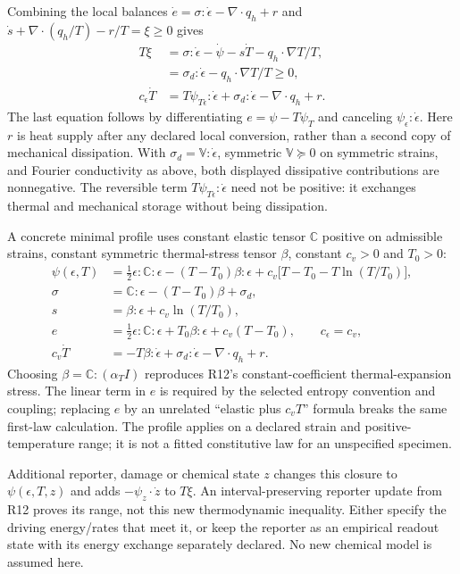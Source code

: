 Combining the local balances
$\dot e=\sigma:\dot\epsilon-\nabla\!\cdot q_h+r$ and
$\dot s+\nabla\!\cdot(q_h/T)-r/T=\xi\ge0$ gives
\begin{align}
 T\xi&=\sigma:\dot\epsilon-\dot\psi-s\dot T
                       -q_h\!\cdot\nabla T/T,\\
 &=\sigma_d:\dot\epsilon-q_h\!\cdot\nabla T/T\ge0,\\
 c_\epsilon\dot T&=T\psi_{T\epsilon}:\dot\epsilon
          +\sigma_d:\dot\epsilon-\nabla\!\cdot q_h+r.
 \label{eq:r13-reciprocal-heat}
\end{align}
The last equation follows by differentiating
$e=\psi-T\psi_T$ and canceling $\psi_\epsilon:\dot\epsilon$.
Here $r$ is heat supply after any declared local conversion, rather than a
second copy of mechanical dissipation. With
$\sigma_d=\mathbb V:\dot\epsilon$, symmetric $\mathbb V\succeq0$ on
symmetric strains, and Fourier conductivity as above, both displayed
dissipative contributions are nonnegative. The reversible term
$T\psi_{T\epsilon}:\dot\epsilon$ need not be positive: it exchanges thermal
and mechanical storage without being dissipation.

A concrete minimal profile uses constant elastic tensor $\mathbb C$ positive
on admissible strains, constant symmetric thermal-stress tensor $\beta$,
constant $c_v>0$ and $T_0>0$:
\begin{align}
 \psi(\epsilon,T)&=\tfrac12\epsilon:\mathbb C:\epsilon
    -(T-T_0)\beta:\epsilon
    +c_v\bigl[T-T_0-T\ln(T/T_0)\bigr],\\
 \sigma&=\mathbb C:\epsilon-(T-T_0)\beta+\sigma_d,\\
 s&=\beta:\epsilon+c_v\ln(T/T_0),\\
 e&=\tfrac12\epsilon:\mathbb C:\epsilon
           +T_0\beta:\epsilon+c_v(T-T_0),\qquad c_\epsilon=c_v,\\
 c_v\dot T&=-T\beta:\dot\epsilon
          +\sigma_d:\dot\epsilon-\nabla\!\cdot q_h+r.
 \label{eq:r13-minimal-thermoelastic}
\end{align}
Choosing $\beta=\mathbb C:(\alpha_T I)$ reproduces R12's constant-coefficient
thermal-expansion stress. The linear term in $e$ is required by the selected
entropy convention and coupling; replacing $e$ by an unrelated
``elastic plus $c_vT$'' formula breaks the same first-law calculation.
The profile applies on a declared strain and positive-temperature range;
it is not a fitted constitutive law for an unspecified specimen.

Additional reporter, damage or chemical state $z$ changes this closure to
$\psi(\epsilon,T,z)$ and adds $-\psi_z\!\cdot\dot z$ to $T\xi$.
An interval-preserving reporter update from R12 proves its range, not this
new thermodynamic inequality. Either specify the driving energy/rates that
meet it, or keep the reporter as an empirical readout state with its energy
exchange separately declared. No new chemical model is assumed here.

